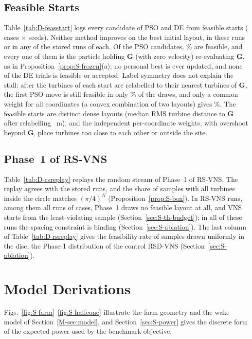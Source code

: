 \documentclass[10pt]{article}
\begin{document}
\subsection{Feasible Starts}
\label{sec:S-diag-feas}
Table~\ref{tab:D-feasstart} logs every candidate of PSO and DE from feasible starts (\NDFsCases{} cases $\times$ \NDFsSeeds{} seeds). Neither method improves on the best initial layout, in these runs or in any of the \NDFsStoredRunsPSO{} stored runs of each. %
Of the \NDFsCandPSO{} PSO candidates, \NDFsFeasCandPSO\% are feasible, and every one of them is the particle holding $\mathbf G$ (with zero velocity) re-evaluating $\mathbf G$, as in Proposition~\ref{prop:S-frozen}(a); no personal best is ever updated, and none of the \NDFsCandDE{} DE trials is feasible or accepted. %
Label symmetry does not explain the stall: after the turbines of each start are relabelled to their nearest turbines of $\mathbf G$, the first PSO move is still feasible in only \NDFsMixMatched\% of the draws, and only a common weight for all coordinates (a convex combination of two layouts) gives \NDFsMixScalar\%. %
The feasible starts are distinct dense layouts (median RMS turbine distance to $\mathbf G$ after relabelling \NDFsInitRms~m), and the independent per-coordinate weights, with overshoot beyond $\mathbf G$, place turbines too close to each other or outside the site. %

\subsection{Phase~1 of RS-VNS}
\label{sec:S-diag-rs}
Table~\ref{tab:D-rsreplay} replays the random stream of Phase~1 of RS-VNS. The replay agrees with the stored runs, and the share of samples with all turbines inside the circle matches $(\pi/4)^N$ (Proposition~\ref{prop:S-box}). In \NDRsRunsNoFeasSample{} RS-VNS runs, among them all runs of \NDRsCasesNoFeasSample{} cases, Phase~1 draws no feasible layout at all, and VNS starts from the least-violating sample (Section~\ref{sec:S-th-budget}); in all of these runs the spacing constraint is binding (Section~\ref{sec:S-ablation}). The last column of Table~\ref{tab:D-rsreplay} gives the feasibility rate of samples drawn uniformly in the disc, the Phase-1 distribution of the control RSD-VNS (Section~\ref{sec:S-ablation}). %

\section{Model Derivations}
\label{sec:S-model}
Figs.~\ref{fig:S-farm}--\ref{fig:S-halfcone} illustrate the farm geometry and the wake model of Section~\ref{M-sec:model}, and Section~\ref{sec:S-power} gives the discrete form of the expected power used by the benchmark objective.
\end{document}
